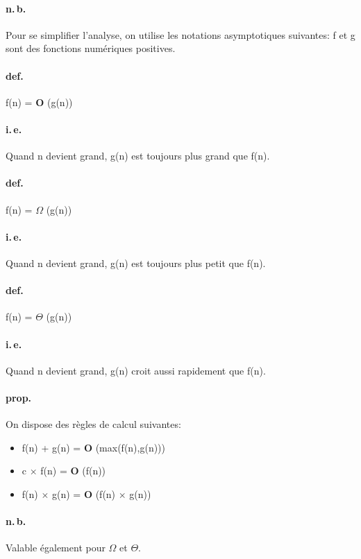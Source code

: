\documentclass{report}
\begin{document}
    \paragraph{n.\,b.} Pour se simplifier l'analyse, on utilise les notations asymptotiques suivantes: f et g sont des fonctions numériques positives.

    \paragraph{def.} f(n) = \textbf{O} (g(n))
    \paragraph{i.\,e.} Quand n devient grand, g(n) est toujours plus grand que f(n).

    \paragraph{def.} f(n) = \textbf{$\Omega$} (g(n))
    \paragraph{i.\,e.} Quand n devient grand, g(n) est toujours plus petit que f(n).

    \paragraph{def.} f(n) = \textbf{$\Theta$} (g(n))
    \paragraph{i.\,e.} Quand n devient grand, g(n) croit aussi rapidement que f(n).

    \paragraph{prop.} On dispose des règles de calcul suivantes:
    \begin{itemize}
      \item f(n) + g(n) = \textbf{O} (max(f(n),g(n)))
      \item c $\times$ f(n) = \textbf{O} (f(n))
      \item f(n) $\times$ g(n) = \textbf{O} (f(n) $\times$ g(n))
    \end{itemize}
    \paragraph{n.\,b.} Valable également pour $\Omega$ et $\Theta$.
\end{document}
